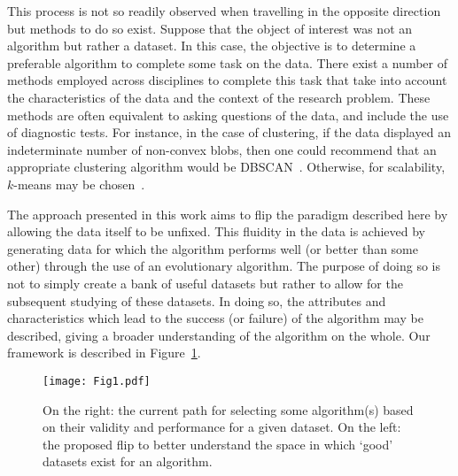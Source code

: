 \documentclass[11pt]{article}
\begin{document}
This process is not so readily observed when travelling in the opposite
direction but methods to do so exist. Suppose that the object of interest was
not an algorithm but rather a dataset. In this case, the objective is to
determine a preferable algorithm to complete some task on the data.  There exist
a number of methods employed across disciplines to complete this task that take
into account the characteristics of the data and the context of the research
problem. These methods are often equivalent to asking questions of the data, and
include the use of diagnostic tests. For instance, in the case of clustering, if
the data displayed an indeterminate number of non-convex blobs, then one could
recommend that an appropriate clustering algorithm would be
DBSCAN~\cite{Ester1996}. Otherwise, for scalability, \(k\)-means may be
chosen~\cite{Wu2009,Zhao2009}.

The approach presented in this work aims to flip the paradigm described here by
allowing the data itself to be unfixed. This fluidity in the data is achieved by
generating data for which the algorithm performs well (or better than some
other) through the use of an evolutionary algorithm. The purpose of doing so is
not to simply create a bank of useful datasets but rather to allow for the
subsequent studying of these datasets. In doing so, the attributes and
characteristics which lead to the success (or failure) of the algorithm may be
described, giving a broader understanding of the algorithm on the whole. Our
framework is described in Figure~\ref{fig:paradigm}.

\begin{figure}[htbp]
    \centering
    \texttt{[image: Fig1.pdf]}
    \caption{%
        On the right: the current path for selecting some algorithm(s) based on
        their validity and performance for a given dataset. On the left: the
        proposed flip to better understand the space in which `good' datasets
        exist for an algorithm.
    }\label{fig:paradigm}
\end{figure}
\end{document}
